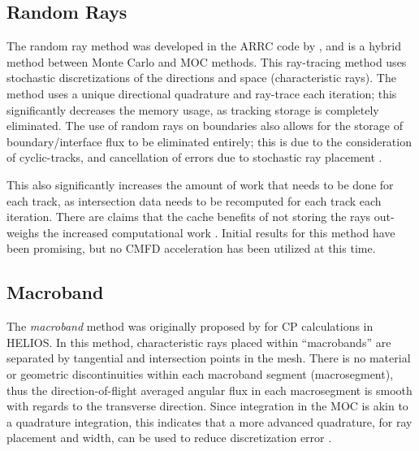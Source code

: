 {{      \subsection{Random Rays}{\label{ssec:RT:Random Rays}
        The random ray method was developed in the ARRC code by \citet{Tramm2018}, and is a hybrid method between Monte Carlo and \ac{MOC} methods.
        This ray-tracing method uses stochastic discretizations of the directions and space (characteristic rays).
        The method uses a unique directional quadrature and ray-trace each iteration; this significantly decreases the memory usage, as tracking storage is completely eliminated.
        The use of random rays on boundaries also allows for the storage of boundary/interface flux to be eliminated entirely; this is due to the consideration of cyclic-tracks, and cancellation of errors due to stochastic ray placement \cite{Tramm2018}.

        This also significantly increases the amount of work that needs to be done for each track, as intersection data needs to be recomputed for each track each iteration.
        There are claims that the cache benefits of not storing the rays out-weighs the increased computational work \cite{Tramm2018}.
        Initial results for this method have been promising, but no \ac{CMFD} acceleration has been utilized at this time.
      }

      \subsection{Macroband}{\label{ssec:RT:Macroband}
        The \emph{macroband} method  was originally proposed by \citet{Villarino1992} for \ac{CP} calculations in HELIOS.
        In this method, characteristic rays placed within ``macrobands'' are separated by tangential and intersection points in the mesh.
        There is no material or geometric discontinuities within each macroband segment (macrosegment), thus the direction-of-flight averaged angular flux in each macrosegment is smooth with regards to the transverse direction.
        Since integration in the \ac{MOC} is akin to a quadrature integration, this indicates that a more advanced quadrature, for ray placement and width, can be used to reduce discretization error \cite{Yamamoto2005}.

}}}
